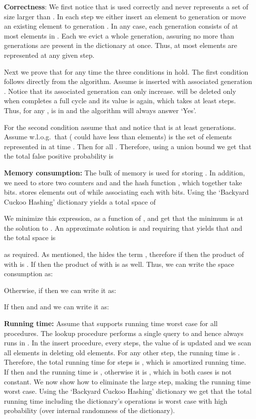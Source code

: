 \documentclass[11pt]{article}
\begin{document}
\noindent
\textbf{Correctness}:
We first notice that  is used correctly and never represents a set of size larger than . In each step we either insert an element to generation  or move an existing element to generation . In any case, each generation consists of at most  elements in . Each  we evict a whole generation, assuring no more than  generations are present in the dictionary at once. Thus, at most  elements are represented at any given step.

Next we prove that for any time  the three conditions in  hold. The first condition follows directly from the algorithm. Assume  is inserted with associated generation . Notice that its associated generation can only increase.  will be deleted only when  completes a full cycle and its value is  again, which takes at least  steps. Thus, for any ,  is in  and the algorithm will always answer `Yes'.

For the second condition assume that  and notice that  is at least  generations. Assume w.l.o.g.\ that  ( could have less than  elements) is the set of elements represented in  at time . Then  for all . Therefore, using a union bound we get that the total false positive probability is



\noindent
\textbf{Memory consumption:}
The bulk of memory is used for storing . In addition, we need to store two counters  and  and the hash function , which together take  bits.  stores  elements out of  while associating each with  bits. Using the `Backyard Cuckoo Hashing' dictionary yields a total space of

We minimize this expression, as a function of , and get that the minimum is at the solution to . An approximate solution is  and requiring that  yields that  and the total space is

as required. As mentioned, the  hides the term , therefore if  then the product of  with  is . If  then the product of  with  is  as well. Thus, we can write the space consumption as:

Otherwise, if  then we can write it as:

If  then  and  and we can write it as:

\noindent
\textbf{Running time:}
Assume that  supports  running time worst case for all procedures. The lookup procedure performs a single query to  and hence always runs in . In the insert procedure, every  steps, the value of  is updated and we scan all elements in  deleting old elements. For any other step, the running time is . Therefore, the total running time for  steps is , which is  amortized running time. If  then  and the running time is , otherwise it is , which in both cases is not constant. We now show how to eliminate the large step, making the running time  worst case. Using the `Backyard Cuckoo Hashing' dictionary we get that the total running time including the dictionary's operations is  worst case with high probability (over internal randomness of the dictionary).
\end{document}
